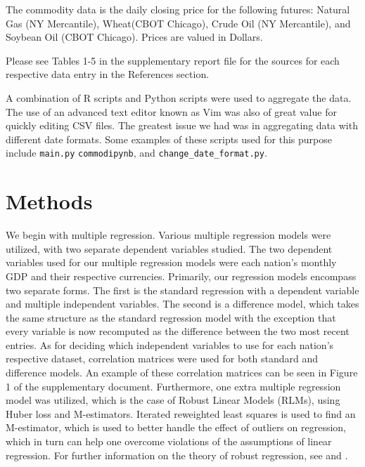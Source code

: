 \documentclass[11pt,regno]{amsart}
\theoremstyle{plain}
\numberwithin{equation}{section}
\begin{document}
The commodity data is the daily closing price for the following futures: Natural Gas (NY Mercantile), Wheat(CBOT Chicago), Crude Oil (NY Mercantile), and Soybean Oil (CBOT Chicago). Prices are valued in Dollars.

Please see Tables 1-5 in the supplementary report file for the sources for each respective data entry in the References section.


A combination of R scripts and Python scripts were used to aggregate the data. The use of an advanced text editor known as Vim was also of great value for quickly editing CSV files. The greatest issue we had was in aggregating data with different date formats. Some examples of these scripts used for this purpose include \texttt{main.py} \texttt{commod\.ipynb}, and    \texttt{change\_date\_format.py}.







\section*{Methods}

% 

We begin with multiple regression. Various multiple regression models were utilized, with two separate dependent variables studied. The two dependent variables used for our multiple regression models were each nation's monthly GDP and their respective currencies. Primarily, our regression models encompass two separate forms. The first is the standard regression with a dependent variable and multiple independent variables. The second is a difference model, which takes the same structure as the standard regression model with the exception that every variable is now recomputed as the difference between the two most recent entries. As for deciding which independent variables to use for each nation's respective dataset, correlation matrices were used for both standard and difference models. An example of these correlation matrices can be seen in Figure 1 of the supplementary document. Furthermore, one extra multiple regression model was utilized, which is the case of Robust Linear Models (RLMs), using Huber loss and M-estimators. Iterated reweighted least squares is used to find an M-estimator, which is used to better handle the effect of outliers on regression, which in turn can help one overcome violations of the assumptions of linear regression. For further information on the theory of robust regression, see \cite{RobustRegression} and \cite{Huber}.
\end{document}
